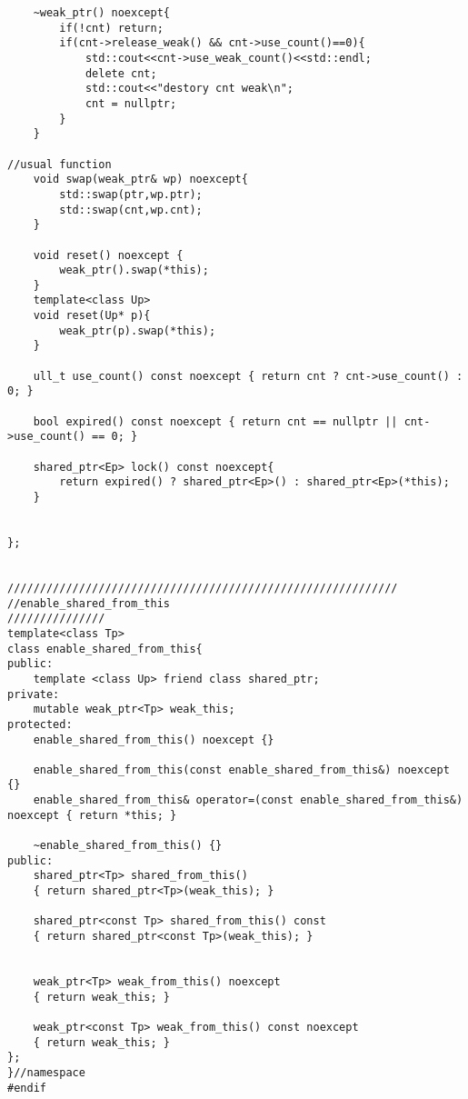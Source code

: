 \begin{lstlisting}
	~weak_ptr() noexcept{
		if(!cnt) return;
		if(cnt->release_weak() && cnt->use_count()==0){
			std::cout<<cnt->use_weak_count()<<std::endl;
			delete cnt;
			std::cout<<"destory cnt weak\n";
			cnt = nullptr;
		}
	}

//usual function
	void swap(weak_ptr& wp) noexcept{
		std::swap(ptr,wp.ptr);
		std::swap(cnt,wp.cnt);
	}

	void reset() noexcept {
		weak_ptr().swap(*this);
	}
	template<class Up>
	void reset(Up* p){
		weak_ptr(p).swap(*this);
	}

	ull_t use_count() const noexcept { return cnt ? cnt->use_count() : 0; }

	bool expired() const noexcept { return cnt == nullptr || cnt->use_count() == 0; }

	shared_ptr<Ep> lock() const noexcept{
		return expired() ? shared_ptr<Ep>() : shared_ptr<Ep>(*this);
	}


};


////////////////////////////////////////////////////////////
//enable_shared_from_this
///////////////
template<class Tp>
class enable_shared_from_this{   
public:
	template <class Up> friend class shared_ptr;
private:
	mutable weak_ptr<Tp> weak_this;
protected:
	enable_shared_from_this() noexcept {}

	enable_shared_from_this(const enable_shared_from_this&) noexcept {}
	enable_shared_from_this& operator=(const enable_shared_from_this&) noexcept { return *this; }

	~enable_shared_from_this() {}
public:
	shared_ptr<Tp> shared_from_this() 
	{ return shared_ptr<Tp>(weak_this); }

	shared_ptr<const Tp> shared_from_this() const 
	{ return shared_ptr<const Tp>(weak_this); }


	weak_ptr<Tp> weak_from_this() noexcept
	{ return weak_this; }

	weak_ptr<const Tp> weak_from_this() const noexcept
	{ return weak_this; }
};
}//namespace
#endif
\end{lstlisting}